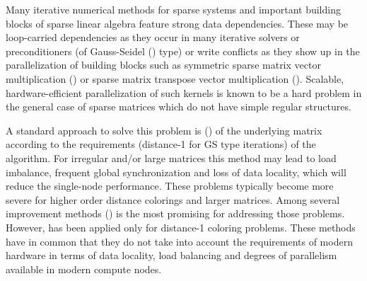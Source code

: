 Many iterative numerical methods for sparse systems and important building blocks of sparse linear algebra feature strong data dependencies. These may be loop-carried dependencies as they occur in many iterative solvers or preconditioners (\eg of Gauss-Seidel (\GS) type) or write conflicts as they show up in the parallelization of building blocks such as symmetric sparse matrix vector multiplication (\SymmSpmv) or sparse matrix transpose vector multiplication (\SpMTV). Scalable, hardware-efficient parallelization of such kernels is known to be a hard problem in the general case of sparse matrices which do not have simple regular structures.

A standard approach to solve this problem is \MCfull (\MC) of the underlying matrix according to the requirements (\eg distance-1 for GS type iterations) of the algorithm. For irregular and/or large matrices this method may lead to load imbalance, frequent global synchronization and loss of data locality, which will reduce the single-node performance. These problems typically become more severe for higher order distance colorings and larger matrices. Among several improvement methods \ABMCfull (\ABMC) is the most promising for addressing those problems. However, \ABMC has been applied only for distance-1 coloring problems. These methods have in common that they do not take into account the requirements of modern hardware in terms of data locality, load balancing and degrees of parallelism available in modern compute nodes.

